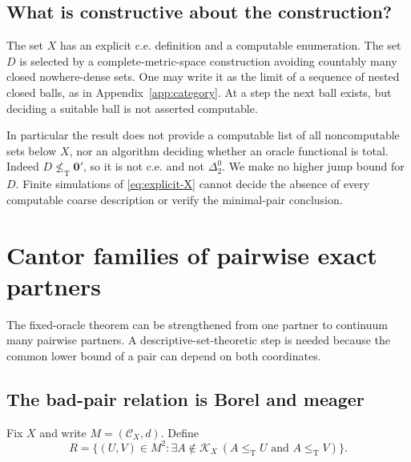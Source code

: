 \documentclass[11pt,a4paper]{article}
\newcommand{\leT}{\leq_{\mathrm T}}
\newcommand{\nleT}{\nleq_{\mathrm T}}
\newcommand{\CD}[1]{\mathcal C_{#1}}
\newcommand{\Core}[1]{\mathcal K_{#1}}
\theoremstyle{definition}\newtheorem{definition}[theorem]{Definition}
\theoremstyle{remark}\newtheorem{remark}[theorem]{Remark}
\begin{document}
\subsection{What is constructive about the construction?}
The set $X$ has an explicit c.e. definition and a computable enumeration. The set $D$ is selected by a complete-metric-space construction avoiding countably many closed nowhere-dense sets. One may write it as the limit of a sequence of nested closed balls, as in Appendix~\ref{app:category}. At a step the next ball exists, but deciding a suitable ball is not asserted computable.

In particular the result does not provide a computable list of all noncomputable sets below $X$, nor an algorithm deciding whether an oracle functional is total. Indeed $D\nleT\mathbf0'$, so it is not c.e. and not $\Delta^0_2$. We make no higher jump bound for $D$. Finite simulations of \eqref{eq:explicit-X} cannot decide the absence of every computable coarse description or verify the minimal-pair conclusion.

\section{Cantor families of pairwise exact partners}
\label{sec:perfect}
The fixed-oracle theorem can be strengthened from one partner to continuum many pairwise partners. A descriptive-set-theoretic step is needed because the common lower bound of a pair can depend on both coordinates.

\subsection{The bad-pair relation is Borel and meager}
Fix $X$ and write $M=(\CD X,d)$. Define
\begin{equation}\label{eq:bad-relation}
 R=\{(U,V)\in M^2:\exists A\notin\Core X\ (A\leT U\text{ and }A\leT V)\}.
\end{equation}
\end{document}
